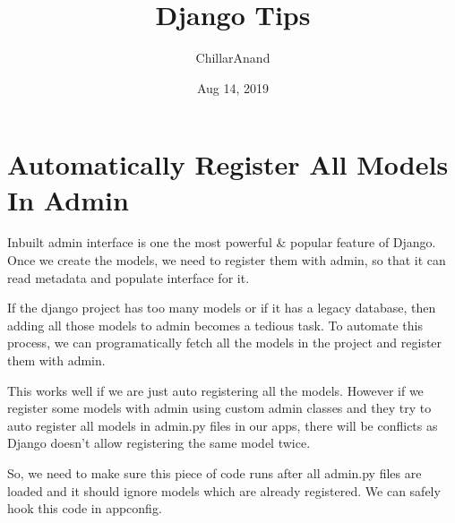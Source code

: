 \documentclass[a5paper,10pt,english]{sphinxmanual}
\title{Django Tips}
\date{Aug 14, 2019}
\author{ChillarAnand}
\begin{document}
\pagestyle{empty}
\sphinxmaketitle
\pagestyle{plain}
\sphinxtableofcontents
\pagestyle{normal}
\label{\detokenize{index::doc}}



\chapter{Automatically Register All Models In Admin}
\label{\detokenize{admin_auto_register_models:automatically-register-all-models-in-admin}}\label{\detokenize{admin_auto_register_models::doc}}
Inbuilt admin interface is one the most powerful \& popular feature of Django. Once we create the models, we need to register them with admin, so that it can read metadata and populate interface for it.

If the django project has too many models or if it has a legacy database, then adding all those models to admin becomes a tedious task. To automate this process, we can programatically fetch all the models in the project and register them with admin.

\begin{sphinxVerbatim}[commandchars=\\\{\}]
   


  

   
\end{sphinxVerbatim}

This works well if we are just auto registering all the models. However if we register some models with admin using custom admin classes and they try to auto register all models in admin.py files in our apps, there will be conflicts as Django doesn’t allow registering the same model twice.

So, we need to make sure this piece of code runs after all admin.py files are loaded and it should ignore models which are already registered. We can safely hook this code in appconfig.
\end{document}
